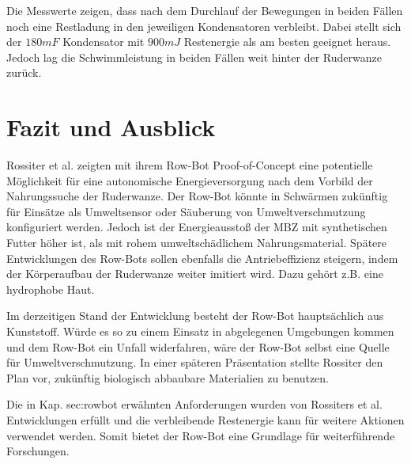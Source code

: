 \documentclass{SeminarV2}
\begin{document}
Die Messwerte zeigen, dass nach dem Durchlauf der Bewegungen in beiden Fällen noch eine Restladung in den jeweiligen Kondensatoren verbleibt. Dabei stellt sich der $180mF$ Kondensator mit $900mJ$ Restenergie als am besten geeignet heraus. Jedoch lag die Schwimmleistung in beiden Fällen weit hinter der Ruderwanze zurück.\cite[S. 3891 f.]{DBLP:conf/iros/PhilamoreRSI15}

\section{Fazit und Ausblick}
Rossiter et al. zeigten mit ihrem Row-Bot Proof-of-Concept eine potentielle Möglichkeit für eine autonomische Energieversorgung nach dem Vorbild der Nahrungssuche der Ruderwanze. Der Row-Bot könnte in Schwärmen zukünftig für Einsätze als Umweltsensor oder Säuberung von Umweltverschmutzung konfiguriert werden.\cite{ted} Jedoch ist der Energieausstoß der MBZ mit synthetischen Futter höher ist, als mit rohem umweltschädlichem Nahrungsmaterial.\cite[S. 3892]{DBLP:conf/iros/PhilamoreRSI15} Spätere Entwicklungen des Row-Bots sollen ebenfalls die Antriebeffizienz steigern, indem der Körperaufbau der Ruderwanze weiter imitiert wird. Dazu gehört z.B. eine hydrophobe Haut.\cite[S. 3893]{DBLP:conf/iros/PhilamoreRSI15}

Im derzeitigen Stand der Entwicklung besteht der Row-Bot hauptsächlich aus Kunststoff. Würde es so zu einem Einsatz in abgelegenen Umgebungen kommen und dem Row-Bot ein Unfall widerfahren, wäre der Row-Bot selbst eine Quelle für Umweltverschmutzung. In einer späteren Präsentation stellte Rossiter den Plan vor, zukünftig biologisch abbaubare Materialien zu benutzen.\cite{ted}\cite{book:ross}

Die in Kap. {sec:rowbot} erwähnten Anforderungen wurden von Rossiters et al. Entwicklungen erfüllt und die verbleibende Restenergie kann für weitere Aktionen verwendet werden. Somit bietet der Row-Bot eine Grundlage für weiterführende Forschungen.


\begin{footnotesize}






\end{footnotesize}

\end{document}

